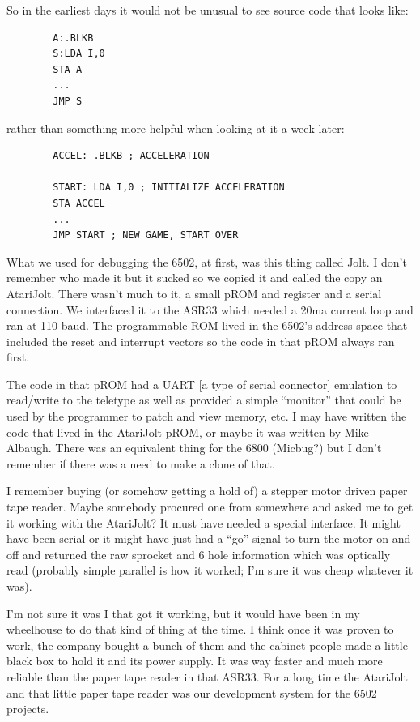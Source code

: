 So in the earliest days it would not be unusual to see source code that looks like:

\begin{lstlisting}
        A:.BLKB
        S:LDA I,0
        STA A
        ...
        JMP S
\end{lstlisting}

rather than something more helpful when looking at it a week later:

\begin{lstlisting}
        ACCEL: .BLKB ; ACCELERATION

        START: LDA I,0 ; INITIALIZE ACCELERATION
        STA ACCEL
        ...
        JMP START ; NEW GAME, START OVER
\end{lstlisting}

What we used for debugging the 6502, at first, was this thing called Jolt. I don't remember who made it but it sucked so we copied it and called the copy an AtariJolt. There wasn't much to it, a small pROM and register and a serial connection. We interfaced it to the ASR33 which needed a 20ma current loop and ran at 110 baud. The programmable ROM lived in the 6502's address space that included the reset and interrupt vectors so the code in that pROM always ran first. 

The code in that pROM had a UART [a type of serial connector] emulation to read/write to the teletype as well as provided a simple “monitor” that could be used by the programmer to patch and view memory, etc. I may have written the code that lived in the AtariJolt pROM, or maybe it was written by Mike Albaugh. There was an equivalent thing for the 6800 (Micbug?) but I don't remember if there was a need to make a clone of that.

I remember buying (or somehow getting a hold of) a stepper motor driven paper tape reader. Maybe somebody procured one from somewhere and asked me to get it working with the AtariJolt? It must have needed a special interface. It might have been serial or it might have just had a “go” signal to turn the motor on and off and returned the raw sprocket and 6 hole information which was optically read (probably simple parallel is how it worked; I'm sure it was cheap whatever it was). 

I'm not sure it was I that got it working, but it would have been in my wheelhouse to do that kind of thing at the time. I think once it was proven to work, the company bought a bunch of them and the cabinet people made a little black box to hold it and its power supply. It was way faster and much more reliable than the paper tape reader in that ASR33. For a long time the AtariJolt and that little paper tape reader was our development system for the 6502 projects. 

